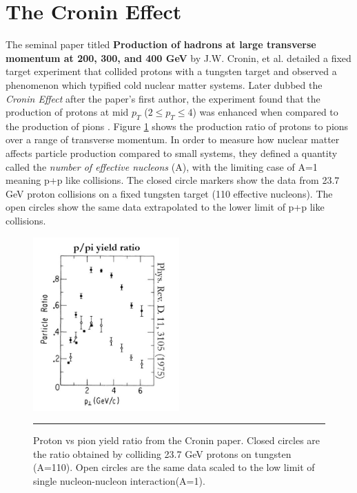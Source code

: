 \section{The Cronin Effect}
The seminal paper titled \textbf{Production of hadrons at large transverse momentum at 200, 300, and 400 GeV} by J.W. Cronin, et al. detailed a fixed target experiment that collided protons with a tungsten target and observed a phenomenon which typified cold nuclear matter systems. Later dubbed the \textit{Cronin Effect} after the paper's first author, the experiment found that the production of protons at mid $p_{T}$ ($2\leq p_{T} \leq 4$) was enhanced when compared to the production of pions \citep{croninpaper}. Figure \ref{fig:croninratio} shows the production ratio of protons to pions over a range of transverse momentum. In order to measure how nuclear matter affects particle production compared to small systems, they defined a quantity called the \textit{number of effective nucleons} (A), with the limiting case of A=1 meaning p+p like collisions. The closed circle markers show the data from 23.7 GeV proton collisions on a fixed tungsten target (110 effective nucleons). The open circles show the same data extrapolated to the lower limit of p+p like collisions.
\begin{figure}[htbp!]
  \centering
    \includegraphics[width=0.5\textwidth]{prevplots/croninratio.JPG}
    \rule{35em}{0.5pt}
  \caption[Proton vs pion yield ratio from the Cronin paper]{Proton vs pion yield ratio from the Cronin paper. Closed circles are the ratio obtained by colliding 23.7 GeV protons on tungsten (A=110). Open circles are the same data scaled to the low limit of single nucleon-nucleon interaction(A=1).}
  \label{fig:croninratio}
\end{figure}


